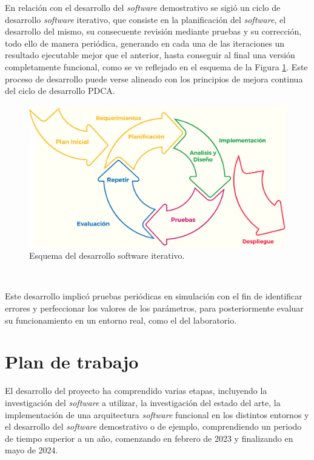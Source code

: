 En relación con el desarrollo del \textit{software} demostrativo se sigió un
ciclo de desarrollo \textit{software} iterativo, que consiste en la
planificación del \textit{software}, el desarrollo del mismo, su consecuente
revisión mediante pruebas y su corrección, todo ello de manera periódica,
generando en cada una de las iteraciones un resultado ejecutable mejor que el
anterior, hasta conseguir al final una versión completamente funcional, como se
ve reflejado en el esquema de la Figura \ref{fig:desarrollo_iterativo}.
Este proceso de desarrollo puede verse alineado con los principios de mejora
continua del ciclo de desarrollo PDCA.

\begin{figure} [h!]
    \begin{center}
      \includegraphics[width=12cm]{figs/desarrollo_iterativo}
    \end{center}
    \caption{Esquema del desarrollo software iterativo.}
    \label{fig:desarrollo_iterativo}
  \end{figure}\

Este desarrollo implicó pruebas periódicas en simulación con el fin de
identificar errores y perfeccionar los valores de los parámetros, para
posteriormente evaluar su funcionamiento en un entorno real, como el del
laboratorio.


\section{Plan de trabajo}
\label{sec:plantrabajo}

El desarrollo del proyecto ha comprendido varias etapas, incluyendo la
investigación del \textit{software} a utilizar, la investigación del estado del
arte, la implementación de una arquitectura \textit{software} funcional en los
distintos entornos y el desarrollo del \textit{software} demostrativo o de
ejemplo, comprendiendo un periodo de tiempo superior a un año, comenzando en
febrero de 2023 y finalizando en mayo de 2024.

